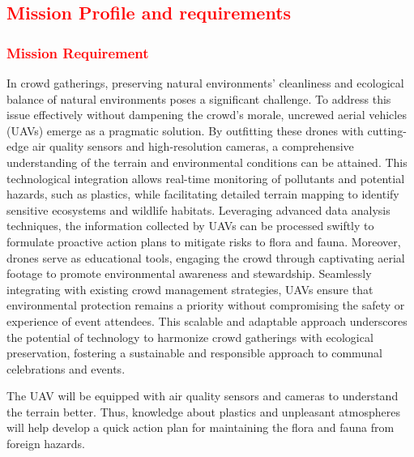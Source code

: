 \documentclass[12 pt]{article}
\begin{document}
\subsection{\textcolor{red}{Mission Profile and requirements}}

\subsubsection{\textcolor{red}{Mission Requirement}}
In crowd gatherings, preserving natural environments' cleanliness and ecological balance of natural environments poses a significant challenge. To address this issue effectively without dampening the crowd's morale, uncrewed aerial vehicles (UAVs) emerge as a pragmatic solution. By outfitting these drones with cutting-edge air quality sensors and high-resolution cameras, a comprehensive understanding of the terrain and environmental conditions can be attained. This technological integration allows real-time monitoring of pollutants and potential hazards, such as plastics, while facilitating detailed terrain mapping to identify sensitive ecosystems and wildlife habitats. Leveraging advanced data analysis techniques, the information collected by UAVs can be processed swiftly to formulate proactive action plans to mitigate risks to flora and fauna.
Moreover, drones serve as educational tools, engaging the crowd through captivating aerial footage to promote environmental awareness and stewardship. Seamlessly integrating with existing crowd management strategies, UAVs ensure that environmental protection remains a priority without compromising the safety or experience of event attendees. This scalable and adaptable approach underscores the potential of technology to harmonize crowd gatherings with ecological preservation, fostering a sustainable and responsible approach to communal celebrations and events. 

The UAV will be equipped with air quality sensors and cameras to understand the terrain better. Thus, knowledge about plastics and unpleasant atmospheres will help develop a quick action plan for maintaining the flora and fauna from foreign hazards.
\end{document}
